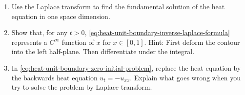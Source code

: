 \begin{enumerate}[label=\thesection.\arabic*.,ref=\thesection.\arabic*,start=45,series=book-problems]
(b) Let $f,g\in\mathcal{S}^{\prime}(\mathbb{R})$ have support in $\{x\geq0\}$. Show that $f*g$ also has support in $\{x\geq0\}$ and that \eqref{eq:fourier-convolution-product-test-functions} holds (in the pointwise sense) in the lower half-plane.

\item\label{ex:laplace-one-dimensional-heat-fundamental} Use the Laplace transform to find the fundamental solution of the heat equation in one space dimension.

\item\label{ex:laplace-heat-boundary-smoothness} Show that, for any $t>0$, \eqref{eq:heat-unit-boundary-inverse-laplace-formula} represents a $C^\infty$ function of $x$ for $x\in[0,1]$. Hint: First deform the contour into the left half-plane. Then differentiate under the integral.

\item\label{ex:backwards-heat-laplace-failure} In \eqref{eq:heat-unit-boundary-zero-initial-problem}, replace the heat equation by the backwards heat equation $u_t=-u_{xx}$. Explain what goes wrong when you try to solve the problem by Laplace transform.

\end{enumerate}
